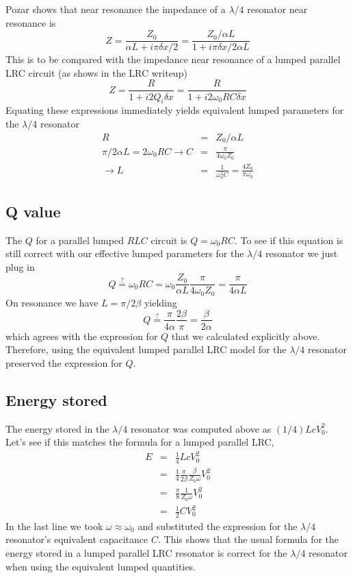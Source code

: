 \documentclass{article}
\begin{document}
Pozar shows that near resonance the impedance of a $\lambda/4$ resonator near resonance is \begin{equation}
Z = \frac{Z_0} {\alpha L + i\pi \delta x /2} =\frac{Z_0/\alpha L}{1+i\pi \delta x/ 2 \alpha L} \label{eq:lambda4Impedance} \end{equation}
This is to be compared with the impedance near resonance of a lumped parallel LRC circuit (as shows in the LRC writeup) \begin{equation}
Z = \frac{R}{1 + i2Q_i \delta x} = \frac{R}{1 +i2\omega_0 R C \delta x} \end{equation}
Equating these expressions immediately yields equivalent lumped parameters for the $\lambda/4$ resonator \begin{eqnarray}
R &=& Z_0/\alpha L \\
\pi/2\alpha L = 2 \omega_0 R C \rightarrow C &=& \frac{\pi}{4 \omega_0 Z_0} \\
\rightarrow L &=& \frac{1}{\omega_0^2 C} = \frac{4 Z_0}{\pi \omega_0}\end{eqnarray}

\subsection{Q value}

The $Q$ for a parallel lumped $RLC$ circuit is $Q = \omega_0 RC$. To see if this equation is still correct with our effective lumped parameters for the $\lambda/4$ resonator we just plug in \begin{equation}
Q \stackrel{?}{=} \omega_0 R C = \omega_0 \frac{Z_0}{\alpha L} \frac{\pi}{4 \omega_0 Z_0} = \frac{\pi}{4 \alpha L} \end{equation}
On resonance we have $L = \pi/2\beta$ yielding \begin{equation}
Q \stackrel{?}{=} \frac{\pi}{4 \alpha}\frac{2 \beta}{\pi} = \frac{\beta}{2\alpha} \end{equation}
which agrees with the expression for $Q$ that we calculated explicitly above. Therefore, using the equivalent lumped parallel LRC model for the $\lambda/4$ resonator preserved the expression for $Q$.

\subsection{Energy stored}

The energy stored in the $\lambda/4$ resonator was computed above as $(1/4)Lc V_0^2$. Let's see if this matches the formula for a lumped parallel LRC, \begin{eqnarray*}
E &=& \frac{1}{4} Lc V_0^2 \\
&=& \frac{1}{4}\frac{\pi}{2\beta}\frac{\beta}{Z_0 \omega} V_0^2 \\
&=& \frac{\pi}{8}\frac{1}{Z_0 \omega} V_0^2 \\
&=& \frac{1}{2}C V_0^2 \end{eqnarray*}
In the last line we took $\omega \approx \omega_0$ and substituted the expression for the $\lambda/4$ resonator's equivalent capacitance $C$. This shows that the usual formula for the energy stored in a lumped parallel LRC resonator is correct for the $\lambda/4$ resonator when using the equivalent lumped quantities.
\end{document}
